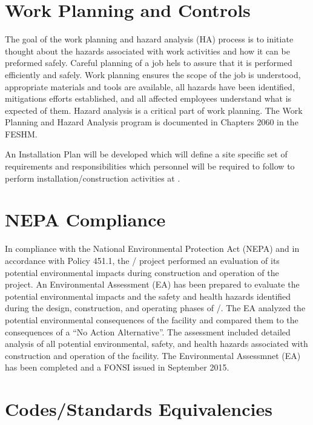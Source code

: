 \section{Work Planning and Controls}

The goal of the work planning and hazard analysis (HA) process is to
initiate thought  about the hazards associated with work activities and
how it can be preformed safely. Careful planning of a job hels to assure that
it is performed efficiently and safely. Work planning ensures the
scope of the job is understood, appropriate materials and tools are
available, all hazards have been identified, mitigations efforts
established, and all affected employees understand what is expected of
them. Hazard analysis is a critical part of work planning.  The Work
Planning and Hazard Analysis program is documented in Chapters 2060 in
the FESHM.

An Installation  Plan will be developed
which will define a site specific set of  requirements and
responsibilities which personnel will be required to follow to perform
installation/construction activities at \surf.

\section{NEPA Compliance}

In compliance with the National Environmental Protection Act (NEPA)
and in accordance with  Policy 451.1, the / project
performed an evaluation of its potential environmental impacts during
construction and operation of the project.  An Environmental
Assessment (EA) has been prepared to evaluate the potential
environmental impacts and the safety and health hazards identified
during the design, construction, and operating phases of /.
The EA analyzed the potential environmental consequences of the
facility and compared them to the consequences of a ``No Action
Alternative''. The assessment included detailed analysis of all
potential environmental, safety, and health hazards associated with
construction and operation of the facility.  The Environmental
Assessmnet (EA) has been completed and a FONSI issued in September
2015.

\section{Codes/Standards Equivalencies}

